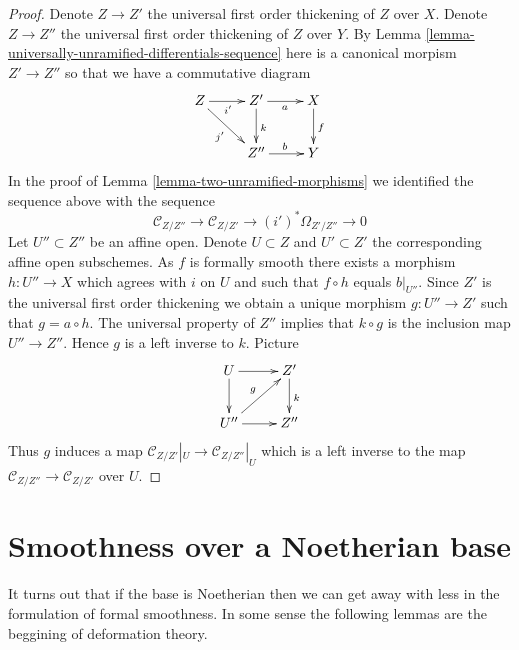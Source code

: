 \begin{proof}
Denote $Z \to Z'$ the universal first order thickening of $Z$ over $X$.
Denote $Z \to Z''$ the universal first order thickening of $Z$ over $Y$.
By
Lemma \ref{lemma-universally-unramified-differentials-sequence}
here is a canonical morpism $Z' \to Z''$ so that we have a commutative
diagram
$$
\xymatrix{
Z \ar[r]_{i'} \ar[rd]_{j'} & Z' \ar[r]_a \ar[d]^k & X \ar[d]^f \\
& Z'' \ar[r]^b & Y
}
$$
In the proof of
Lemma \ref{lemma-two-unramified-morphisms}
we identified the sequence above with the sequence
$$
\mathcal{C}_{Z/Z''} \to
\mathcal{C}_{Z/Z'} \to
(i')^*\Omega_{Z'/Z''} \to 0
$$
Let $U'' \subset Z''$ be an affine open. Denote $U \subset Z$ and
$U' \subset Z'$ the corresponding affine open subschemes.
As $f$ is formally smooth there exists a morphism $h : U'' \to X$
which agrees with $i$ on $U$ and such that $f \circ h$ equals $b|_{U''}$.
Since $Z'$ is the universal first order thickening we obtain a unique
morphism $g : U'' \to Z'$ such that $g = a \circ h$. The universal
property of $Z''$ implies that $k \circ g$ is the inclusion map
$U'' \to Z''$. Hence $g$ is a left inverse to $k$. Picture
$$
\xymatrix{
U \ar[d] \ar[r] & Z' \ar[d]^k \\
U'' \ar[r] \ar[ru]^g & Z''
}
$$
Thus $g$ induces a map $\mathcal{C}_{Z/Z'}|_U \to \mathcal{C}_{Z/Z''}|_U$
which is a left inverse to the map
$\mathcal{C}_{Z/Z''} \to \mathcal{C}_{Z/Z'}$ over $U$.
\end{proof}



































\section{Smoothness over a Noetherian base}
\label{section-smooth-Noetherian}

\noindent
It turns out that if the base is Noetherian then we can get away with
less in the formulation of formal smoothness. In some sense the following
lemmas are the beggining of deformation theory.

